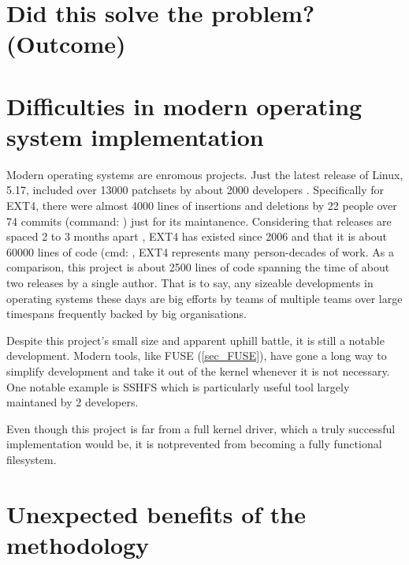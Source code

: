 
    \section{Did this solve the problem? (Outcome)}

    \section{Difficulties in modern operating system implementation}

        Modern operating systems are enromous projects. Just the latest release
        of Linux, 5.17, included over 13000 patchsets by about 2000 developers
        \cite{Linux_dev_count}.  Specifically for EXT4, there were almost 4000
        lines of insertions and deletions by 22 people over 74 commits
        (command: ) just for
        its maintanence. Considering that releases are spaced 2 to 3 months
        apart \cite{Linux_dev_process}, EXT4 has existed since 2006
        \cite{ext4_origin} and that it is about 60000 lines of code (cmd:
        , EXT4 represents many person-decades of work.
        As a comparison, this project is about 2500 lines of code spanning the
        time of about two releases by a single author. That is to say, any
        sizeable developments in operating systems these days are big efforts
        by teams of multiple teams over large timespans frequently backed by
        big organisations.

        Despite this project's small size and apparent uphill battle, it is
        still a notable development. Modern tools, like FUSE (\ref{sec_FUSE}),
        have gone a long way to simplify development and take it out of the
        kernel whenever it is not necessary. One notable example is SSHFS
        \cite{SSHFS} which is particularly useful
        tool largely maintaned by 2 developers.

        Even though this project is far from a full kernel driver, which a
        truly successful implementation would be, it is notprevented from
        becoming a fully functional filesystem.

    \section{Unexpected benefits of the methodology}

